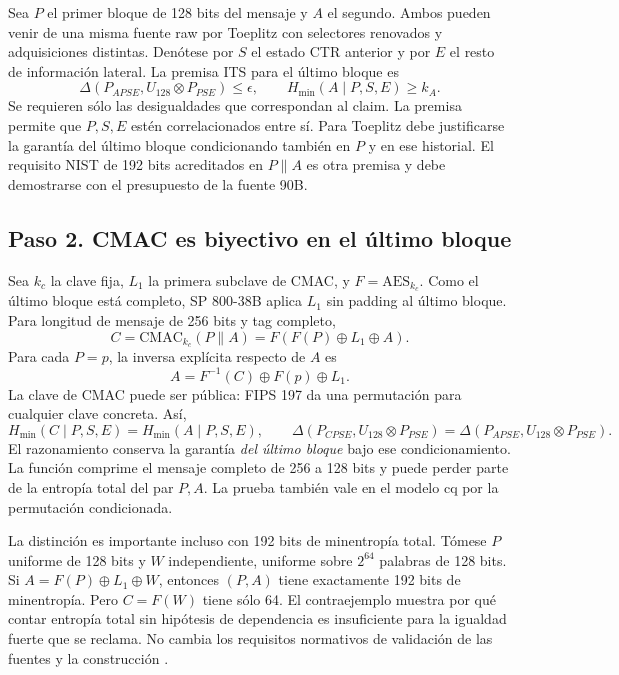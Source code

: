 \documentclass[11pt,a4paper]{article}
\newcommand{\hm}{H_{\min}}
\newcommand{\dist}{\Delta}
\begin{document}
Sea \(P\) el primer bloque de 128 bits del mensaje y \(A\)
el segundo. Ambos pueden venir de una misma fuente raw por
Toeplitz con selectores renovados y adquisiciones distintas.
Denótese por \(S\) el estado CTR anterior y por \(E\) el resto de
información lateral. La premisa ITS para el último bloque es
\[
 \dist(P_{APSE},U_{128}\otimes P_{PSE})\le\epsilon,\qquad
 \hm(A\mid P,S,E)\ge k_A .
\]
Se requieren sólo las desigualdades que correspondan al claim.
La premisa permite que \(P,S,E\) estén correlacionados entre sí.
Para Toeplitz debe justificarse la garantía del último bloque
condicionando también en \(P\) y en ese historial. El requisito
NIST de 192 bits acreditados en \(P\|A\) es otra premisa y debe
demostrarse con el presupuesto de la fuente 90B.

\subsection{Paso 2. CMAC es biyectivo en el último bloque}

Sea \(k_c\) la clave fija, \(L_1\) la primera subclave de CMAC,
y \(F=\mathrm{AES}_{k_c}\). Como el último bloque está
completo, SP 800-38B aplica \(L_1\) sin padding al último
bloque. Para longitud de mensaje de 256 bits y tag completo,
\[
 C=\mathrm{CMAC}_{k_c}(P\|A)
    =F(F(P)\oplus L_1\oplus A).
\]
Para cada \(P=p\), la inversa explícita respecto de \(A\) es
\[
                A=F^{-1}(C)\oplus F(p)\oplus L_1 .
\]
La clave de CMAC puede ser pública: FIPS 197 da una
permutación para cualquier clave concreta. Así,
\[
 \hm(C\mid P,S,E)=\hm(A\mid P,S,E),\qquad
 \dist(P_{CPSE},U_{128}\otimes P_{PSE})
   =\dist(P_{APSE},U_{128}\otimes P_{PSE}).
\]
El razonamiento conserva la garantía \emph{del último
bloque} bajo ese condicionamiento. La función comprime el
mensaje completo de 256 a 128 bits y puede perder parte de
la entropía total del par \(P,A\). La prueba también vale
en el modelo cq por la permutación condicionada.

La distinción es importante incluso con 192 bits de
minentropía total. Tómese \(P\) uniforme de 128 bits y
\(W\) independiente, uniforme sobre \(2^{64}\) palabras de
128 bits. Si \(A=F(P)\oplus L_1\oplus W\), entonces
\((P,A)\) tiene exactamente 192 bits de minentropía.
Pero \(C=F(W)\) tiene sólo 64. El contraejemplo muestra
por qué contar entropía total sin hipótesis de dependencia
es insuficiente para la igualdad fuerte que se reclama.
No cambia los requisitos normativos de validación de las
fuentes y la construcción
\cite[§6.2]{cmac}\cite[§§2.3, 3.1 y 3.2.2.2]{nist90c}.
\end{document}
